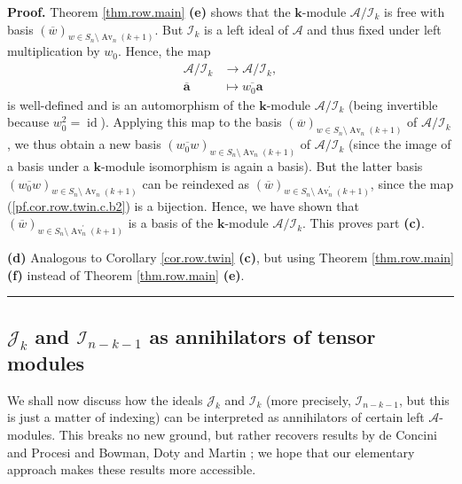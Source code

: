 \documentclass[numbers=enddot,12pt,final,onecolumn,notitlepage]{scrartcl}%
\numberwithin{exer}{subsection}
\theoremstyle{definition}
\newenvironment{proof}[1][Proof]{\noindent\textbf{#1.} }{\ \rule{0.5em}{0.5em}}
\begin{document}
\begin{proof}
Theorem \ref{thm.row.main} \textbf{(e)} shows that the $\mathbf{k}$-module
$\mathcal{A}/\mathcal{I}_{k}$ is free with basis $\left(  \overline{w}\right)
_{w\in S_{n}\setminus\operatorname*{Av}\nolimits_{n}\left(  k+1\right)  }$.
But $\mathcal{I}_{k}$ is a left ideal of $\mathcal{A}$ and thus fixed under
left multiplication by $w_{0}$. Hence, the map%
\begin{align*}
\mathcal{A}/\mathcal{I}_{k}  &  \rightarrow\mathcal{A}/\mathcal{I}_{k},\\
\overline{\mathbf{a}}  &  \mapsto\overline{w_{0}\mathbf{a}}%
\end{align*}
is well-defined and is an automorphism of the $\mathbf{k}$-module
$\mathcal{A}/\mathcal{I}_{k}$ (being invertible because $w_{0}^{2}%
=\operatorname*{id}$). Applying this map to the basis $\left(  \overline
{w}\right)  _{w\in S_{n}\setminus\operatorname*{Av}\nolimits_{n}\left(
k+1\right)  }$ of $\mathcal{A}/\mathcal{I}_{k}$, we thus obtain a new basis
$\left(  \overline{w_{0}w}\right)  _{w\in S_{n}\setminus\operatorname*{Av}%
\nolimits_{n}\left(  k+1\right)  }$ of $\mathcal{A}/\mathcal{I}_{k}$ (since
the image of a basis under a $\mathbf{k}$-module isomorphism is again a
basis). But the latter basis $\left(  \overline{w_{0}w}\right)  _{w\in
S_{n}\setminus\operatorname*{Av}\nolimits_{n}\left(  k+1\right)  }$ can be
reindexed as $\left(  \overline{w}\right)  _{w\in S_{n}\setminus
\operatorname*{Av}\nolimits_{n}^{\prime}\left(  k+1\right)  }$, since the map
(\ref{pf.cor.row.twin.c.b2}) is a bijection. Hence, we have shown that
$\left(  \overline{w}\right)  _{w\in S_{n}\setminus\operatorname*{Av}%
\nolimits_{n}^{\prime}\left(  k+1\right)  }$ is a basis of the $\mathbf{k}%
$-module $\mathcal{A}/\mathcal{I}_{k}$. This proves part \textbf{(c)}.
\medskip

\textbf{(d)} Analogous to Corollary \ref{cor.row.twin} \textbf{(c)}, but using
Theorem \ref{thm.row.main} \textbf{(f)} instead of Theorem \ref{thm.row.main}
\textbf{(e)}.
\end{proof}

\subsection{\label{sec.row.ann}$\mathcal{J}_{k}$ and $\mathcal{I}_{n-k-1}$ as
annihilators of tensor modules}

We shall now discuss how the ideals $\mathcal{J}_{k}$ and $\mathcal{I}_{k}$
(more precisely, $\mathcal{I}_{n-k-1}$, but this is just a matter of indexing)
can be interpreted as annihilators of certain left $\mathcal{A}$-modules. This
breaks no new ground, but rather recovers results by de Concini and Procesi
\cite[Theorem 4.2]{deCPro76} and Bowman, Doty and Martin \cite{BoDoMa22}; we
hope that our elementary approach makes these results more accessible.
\end{document}
